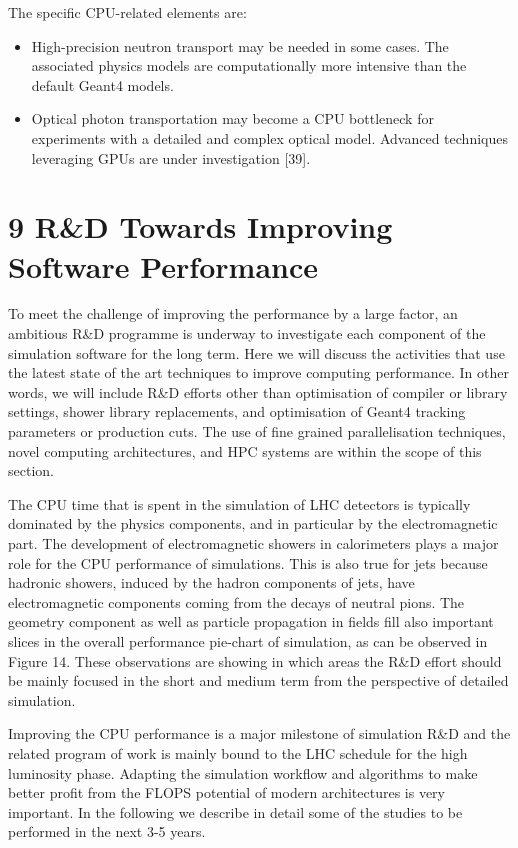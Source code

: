 \documentclass[12pt,a4paper]{article}
\begin{document}
The specific CPU-related elements are:

\begin{itemize}
\item
  High-precision neutron transport may be needed in some cases. The
  associated physics models are computationally more intensive than the
  default Geant4 models.
\item
  Optical photon transportation may become a CPU bottleneck for
  experiments with a detailed and complex optical model. Advanced
  techniques leveraging GPUs are under investigation {[}39{]}.
\end{itemize}

\hypertarget{rd-towards-improving-software-performance}{%
\section{9 R\&D Towards Improving Software Performance
}\label{rd-towards-improving-software-performance}}

To meet the challenge of improving the performance by a large factor, an
ambitious R\&D programme is underway to investigate each component of
the simulation software for the long term. Here we will discuss the
activities that use the latest state of the art techniques to improve
computing performance. In other words, we will include R\&D efforts
other than optimisation of compiler or library settings, shower library
replacements, and optimisation of Geant4 tracking parameters or
production cuts. The use of fine grained parallelisation techniques,
novel computing architectures, and HPC systems are within the scope of
this section.

The CPU time that is spent in the simulation of LHC detectors is
typically dominated by the physics components, and in particular by the
electromagnetic part. The development of electromagnetic showers in
calorimeters plays a major role for the CPU performance of simulations.
This is also true for jets because hadronic showers, induced by the
hadron components of jets, have electromagnetic components coming from
the decays of neutral pions. The geometry component as well as particle
propagation in fields fill also important slices in the overall
performance pie-chart of simulation, as can be observed in Figure 14.
These observations are showing in which areas the R\&D effort should be
mainly focused in the short and medium term from the perspective of
detailed simulation.

Improving the CPU performance is a major milestone of simulation R\&D
and the related program of work is mainly bound to the LHC schedule for
the high luminosity phase. Adapting the simulation workflow and
algorithms to make better profit from the FLOPS potential of modern
architectures is very important. In the following we describe in detail
some of the studies to be performed in the next 3-5 years.
\end{document}

